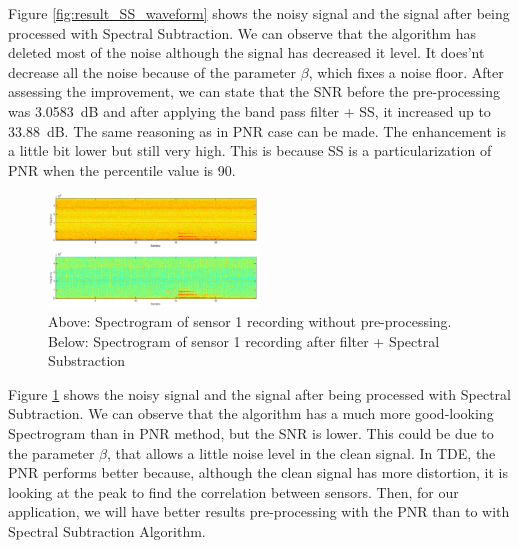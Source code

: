   Figure \ref{fig:result_SS_waveform} shows the noisy signal and the signal after being processed with Spectral Subtraction. We can observe that the algorithm has deleted most of the noise although the signal has decreased it level. It does'nt decrease all the noise because of the parameter $\beta$, which fixes a noise floor.
  After assessing the improvement, we can state that the SNR before the pre-processing was \SI{3.0583}{\dB} and after applying the band pass filter + SS, it increased up to \SI{33.88}{\dB}. The same reasoning as in PNR case can be made. The enhancement is a little bit lower but still very high. This is because SS is a particularization of PNR when the percentile value is 90.

  \begin{figure}[htb]
	  \begin{center}
		  \includegraphics[width=0.5\textwidth]{figures/4SpectralSub_Specgram.png}
	  \end{center}
	  \caption{Above: Spectrogram of sensor 1 recording without pre-processing.  Below: Spectrogram of sensor 1 recording after filter + Spectral Substraction}
	  \label{fig:result_SS_spec}
  \end{figure}
  
  Figure \ref{fig:result_SS_spec} shows the noisy signal and the signal after being processed with Spectral Subtraction. We can observe that the algorithm has a much more good-looking Spectrogram than in PNR method, but the SNR is lower. This could be due to the parameter $\beta$, that allows a little noise level in the clean signal. In TDE, the PNR performs better because, although the clean signal has more distortion, it is looking at the peak to find the correlation between sensors. Then, for our application, we will have better results pre-processing with the PNR than to with Spectral Subtraction Algorithm.
  
